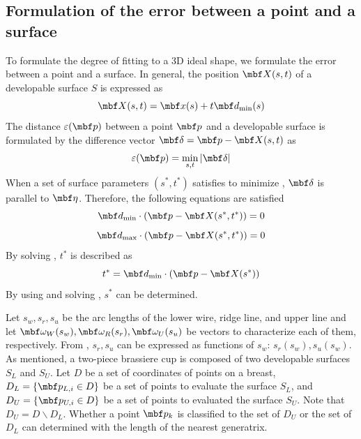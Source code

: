 \documentclass[E]{scitrans}
\begin{document}
\subsection*{Formulation of the error between a point and a surface}
To formulate the degree of fitting to a 3D ideal shape, we formulate the error between a point and a surface. In general, the position $\mbold{X}(s,t)$ of a developable surface $S$ is expressed as
\begin{equation}\label{eq:Sur_eq}
\mbold{X}(s,t) = \mbold{x}(s) + t\mbold{d}_{\min}(s)
\end{equation}
The distance $\varepsilon(\mbold{p})$ between a point $\mbold{p}$ and a developable surface is formulated by the difference vector $\mbold{\delta}=\mbold{p}-\mbold{X}(s,t)$ as
\begin{equation}\label{eq:eps_eq}
\varepsilon(\mbold{p})=\min_{s,t}{|\mbold{\delta}|}
\end{equation}
When a set of surface parameters $ (s^*,t^*) $ satisfies to minimize , $\mbold{\delta}$ is parallel to $ \etavec $. Therefore, the following equations are satisfied
\begin{equation}\label{eq:d_mindoteq}
\mbold{d}_{\min} \cdot (\mbold{p} - \mbold{X}(s^*,t^*)) = 0
\end{equation}
\begin{equation}\label{eq:d_maxdoteq}
\mbold{d}_{\max} \cdot (\mbold{p} - \mbold{X}(s^*,t^*)) = 0
\end{equation}
By solving , $ t^* $ is described as
\begin{equation}\label{eq:t*_eq}
t^* = \mbold{d}_{\min} \cdot (\mbold{p}-\mbold{X}(s^*))
\end{equation}
By using  and solving , $ s^* $ can be determined.

Let $ s_w,s_r,s_u $ be the arc lengths of the lower wire, ridge line, and upper line and let $ \mbold{\omega}_W (s_w ),\mbold{\omega}_R (s_r ),\mbold{\omega}_U (s_u ) $ be vectors to characterize each of them, respectively. From , $ s_r,s_u $ can be expressed as functions of $ s_w $: $ s_r (s_w ),s_u (s_w ) $. As mentioned, a two-piece brassiere cup is composed of two developable surfaces $ S_L $ and $ S_U $. Let $ D $ be a set of coordinates of points on a breast, $ D_L = \{\mbold{p}_{L,i} \in D \} $ be a set of points to evaluate the surface $ S_L $, and $ D_U = \{\mbold{p}_{U,i} \in D \} $ be a set of points to evaluated the surface $ S_U $. Note that $ D_U = D \backslash D_L $. Whether a point $ \mbold{p}_k $ is classified to the set of $ D_U $ or the set of $ D_L $ can determined with the length of the nearest generatrix.
\end{document}
